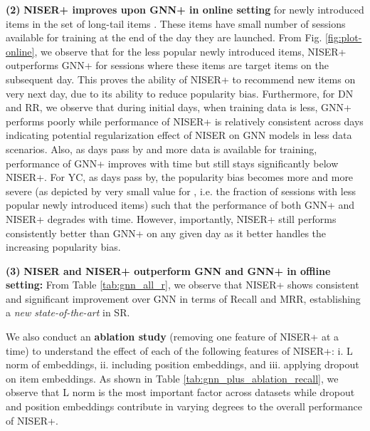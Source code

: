 \documentclass[sigconf]{acmart}
\begin{document}
					
					\noindent \textbf{(2)} \textbf{NISER+ improves upon GNN+ in online setting}
					for newly introduced items in the set of long-tail items . These items have small number of sessions available for training at the end of the day they are launched.
					From Fig. \ref{fig:plot-online}, we observe that for the less popular newly introduced items, NISER+ outperforms GNN+ for sessions where these items are target items on the subsequent day. 
					This proves the ability of NISER+ to recommend new items on very next day, due to its ability to reduce popularity bias. 
					Furthermore, for DN and RR, we observe that during initial days, when training data is less, GNN+ performs poorly while performance of NISER+ is relatively consistent across days indicating potential regularization effect of NISER on GNN models in less data scenarios. 
					Also, as days pass by and more data is available for training, performance of GNN+ improves with time but still stays significantly below NISER+.
					For YC, as days pass by, the popularity bias becomes more and more severe (as depicted by very small value for , i.e. the fraction of sessions with less popular newly introduced items) such that the performance of both GNN+ and NISER+ degrades with time. However, importantly, NISER+ still performs consistently better than GNN+ on any given day as it better handles the increasing popularity bias.
					
					\noindent \textbf{(3)} \textbf{NISER and NISER+ outperform GNN and GNN+ in offline setting:}
					From Table \ref{tab:gnn_all_r}, we observe that NISER+ shows consistent and significant improvement over GNN in terms of Recall and MRR, establishing a \textit{new state-of-the-art} in SR. 
					
					We also conduct an \textbf{ablation study} (removing one feature of NISER+ at a time) to understand the effect of each of the following features of NISER+: i. L norm of embeddings, ii. including position embeddings, and iii. applying dropout on item embeddings. As shown in Table \ref{tab:gnn_plus_ablation_recall}, we observe that L norm is the most important factor across datasets while dropout and position embeddings contribute in varying degrees to the overall performance of NISER+.
					
\end{document}
